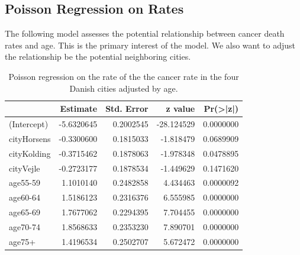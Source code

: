 \documentclass[
]{book}
\newenvironment{Shaded}{\begin{snugshade}}{\end{snugshade}}
\newcommand{\AttributeTok}[1]{\textcolor[rgb]{0.13,0.29,0.53}{#1}}
\newcommand{\FunctionTok}[1]{\textcolor[rgb]{0.13,0.29,0.53}{\textbf{#1}}}
\newcommand{\NormalTok}[1]{#1}
\newcommand{\OtherTok}[1]{\textcolor[rgb]{0.56,0.35,0.01}{#1}}
\newcommand{\SpecialCharTok}[1]{\textcolor[rgb]{0.81,0.36,0.00}{\textbf{#1}}}
\newcommand{\StringTok}[1]{\textcolor[rgb]{0.31,0.60,0.02}{#1}}
\begin{document}
\hypertarget{poisson-regression-on-rates-1}{%
\subsection{Poisson Regression on Rates}\label{poisson-regression-on-rates-1}}

The following model assesses the potential relationship between cancer death rates and age. This is the primary interest of the model. We also want to adjust the relationship be the potential neighboring cities.

\begin{Shaded}
\end{Shaded}

\begin{table}

\caption{\label{tab:unnamed-chunk-159}Poisson regression on the rate of the 
      the cancer rate in the four Danish cities adjusted by age.}
\centering
\begin{tabular}[t]{l|r|r|r|r}
\hline
  & Estimate & Std. Error & z value & Pr(>|z|)\\
\hline
(Intercept) & -5.6320645 & 0.2002545 & -28.124529 & 0.0000000\\
\hline
cityHorsens & -0.3300600 & 0.1815033 & -1.818479 & 0.0689909\\
\hline
cityKolding & -0.3715462 & 0.1878063 & -1.978348 & 0.0478895\\
\hline
cityVejle & -0.2723177 & 0.1878534 & -1.449629 & 0.1471620\\
\hline
age55-59 & 1.1010140 & 0.2482858 & 4.434463 & 0.0000092\\
\hline
age60-64 & 1.5186123 & 0.2316376 & 6.555985 & 0.0000000\\
\hline
age65-69 & 1.7677062 & 0.2294395 & 7.704455 & 0.0000000\\
\hline
age70-74 & 1.8568633 & 0.2353230 & 7.890701 & 0.0000000\\
\hline
age75+ & 1.4196534 & 0.2502707 & 5.672472 & 0.0000000\\
\hline
\end{tabular}
\end{table}
\end{document}
